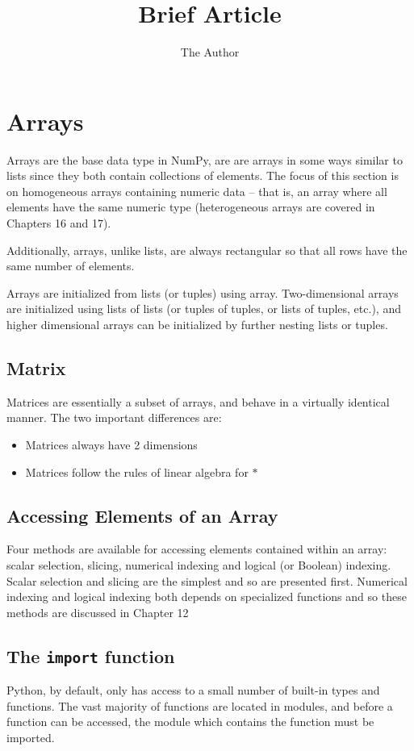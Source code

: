 \documentclass[11pt]{article} %
\title{Brief Article}
\author{The Author}
\begin{document}
\section*{Arrays}
Arrays are the base data type in NumPy, are are arrays in some ways similar to lists since they both contain
collections of elements. The focus of this section is on homogeneous arrays containing numeric data
– that is, an array where all elements have the same numeric type (heterogeneous arrays are covered in
Chapters 16 and 17). 

Additionally, arrays, unlike lists, are always rectangular so that all rows have the same
number of elements.

Arrays are initialized from lists (or tuples) using array. Two-dimensional arrays are initialized using
lists of lists (or tuples of tuples, or lists of tuples, etc.), and higher dimensional arrays can be initialized by
further nesting lists or tuples.

\subsection{Matrix}
Matrices are essentially a subset of arrays, and behave in a virtually identical manner. The two important
differences are:

\begin{itemize}
\item Matrices always have 2 dimensions
\item Matrices follow the rules of linear algebra for $\ast$
\end{itemize}

\newpage

\subsection{Accessing Elements of an Array}
Four methods are available for accessing elements contained within an array: scalar selection, slicing,
numerical indexing and logical (or Boolean) indexing. Scalar selection and slicing are the simplest and so
are presented first. Numerical indexing and logical indexing both depends on specialized functions and
so these methods are discussed in Chapter 12

\subsection{The \texttt{import} function}
Python, by default, only has access to a small number of built-in types and functions. The vast majority of
functions are located in modules, and before a function can be accessed, the module which contains the
function must be imported. 
\end{document}
